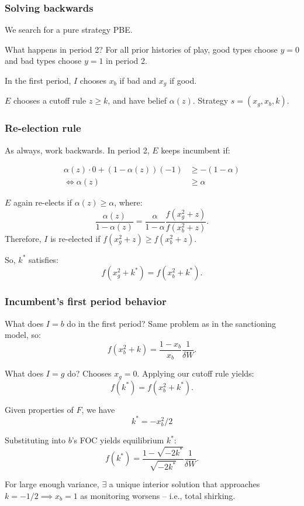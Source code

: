 \documentclass[10pt]{beamer}
\begin{document}
\begin{frame}

\frametitle{Solving backwards}

We search for a pure strategy PBE. 

\bigskip

What happens in period 2? \pause For all prior histories of play, good types choose $y = 0$ and bad types choose $y = 1$ in period 2. 

\bigskip

In the first period, $I$ chooses $x_b$ if bad and $x_g$ if good. 

\bigskip

$E$ chooses a cutoff rule $z\geq k$, and have belief $\alpha(z)$. Strategy $s = (x_g, x_b, k)$.





\end{frame}



\begin{frame}

\frametitle{Re-election rule}

As always, work backwards. In period 2, $E$ keeps incumbent if:

\vspace{-0.5cm}
\begin{align*}
\alpha(z)\cdot 0 + (1-\alpha(z))(-1) &\geq -(1-\alpha) \\
\Leftrightarrow \alpha(z) &\geq \alpha
\end{align*}

$E$ again re-elects if $\alpha(z)\geq \alpha$, where: $$\frac{\alpha(z)}{1-\alpha(z)} = \frac{\alpha}{1-\alpha}\frac{f(x_g^2+z)}{f(x_b^2+z)}.$$ Therefore, $I$ is re-elected if $f(x_g^2+z)\geq f(x_b^2+z)$. 

\bigskip

So, $k^*$ satisfies: $$f(x_g^2+k^*) = f(x_b^2+k^*).$$


\end{frame}


\begin{frame}

\frametitle{Incumbent's first period behavior}

What does $I=b$ do in the first period? \pause Same problem as in the sanctioning model, so: $$ f(x_b^2+k) = \frac{1-x_b}{x_b}\frac{1}{\delta W}.$$ 

What does $I=g$ do? \pause Chooses $x_g=0$. Applying our cutoff rule yields: $$f(k^*) = f(x_b^2+k^*).$$ 

Given properties of $F$, we have $$k^* = -x_b^2/2$$ 

Substituting into $b$'s FOC yields equilibrium $k^*$: $$f(k^*) = \frac{1-\sqrt{-2k^*}}{\sqrt{-2k^*}}\frac{1}{\delta W}.$$ 


For large enough variance, $\exists$ a unique interior solution that approaches $k = -1/2 \implies x_b = 1$ as monitoring worsens -- i.e., total shirking. 


\end{frame}
\end{document}
